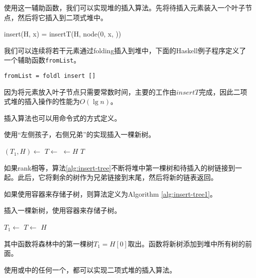 \documentclass[UTF8]{article}
\begin{document}
使用这一辅助函数，我们可以实现堆的插入算法。先将待插入元素装入一个叶子节点，然后将它插入到二项式堆中。

\be
insert(H, x) = insertT(H, node(0, x, \phi))
\ee

我们可以连续将若干元素通过folding插入到堆中，下面的Haskell例子程序定义了一个辅助函数\texttt{fromList}。

\begin{lstlisting}
fromList = foldl insert []
\end{lstlisting}

因为将元素放入叶子节点只需要常数时间，主要的工作由$insertT$完成，因此二项式堆的插入操作的性能为$O(\lg n)$。

插入算法也可以用命令式的方式定义。

\begin{algorithm}
\caption{使用“左侧孩子，右侧兄弟”的实现插入一棵新树。}
\label{alg:insert-tree}
\begin{algorithmic}[1]
    \State $(T_1, H) \gets$ 
    \State $T \gets $ 
  \EndWhile
  \State {} $\gets H$
  \State \Return $T$
\EndFunction
\end{algorithmic}
\end{algorithm}

如果rank相等，算法\ref{alg:insert-tree}不断将堆中第一棵树和待插入的树链接到一起。此后，它将剩余的树作为兄弟链接到末尾，然后将新的链表返回。

如果使用容器来存储子树，则算法定义为Algorithm \ref{alg:insert-tree1}。

\begin{algorithm}
\caption{插入一棵新树，使用容器来存储子树。}
\label{alg:insert-tree1}
\begin{algorithmic}[1]
    \State $T_1 \gets$ 
    \State $T \gets $ 
  \EndWhile
  \State {}
  \State \Return $H$
\EndFunction
\end{algorithmic}
\end{algorithm}

其中函数将森林中的第一棵树$T_1 = H[0]$取出。函数将新树添加到堆中所有树的前面。

使用或中的任何一个，都可以实现二项式堆的插入算法。
\end{document}
